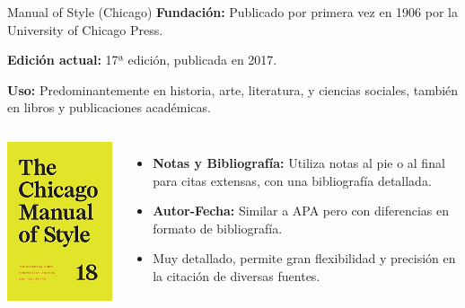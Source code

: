 \documentclass[
11pt, %
]{beamer}
\begin{document}
\begin{frame}{Manual of Style (Chicago)}
	\textbf{Fundación:} Publicado por primera vez en 1906 por la University of Chicago Press.

	\textbf{Edición actual:} 17ª edición, publicada en 2017.

	\textbf{Uso:} Predominantemente en historia, arte, literatura, y ciencias sociales, también en libros y publicaciones académicas.
	\begin{columns}[T]
		\centering
		\includegraphics[width=\textwidth]{The_Chicago_Manual_of_Style_18th_edition_cover.jpg} %
		\vspace{0.5cm}
		\begin{itemize}
			\item \textbf{Notas y Bibliografía:} Utiliza notas al pie o al final para citas extensas, con una bibliografía detallada.
			\item \textbf{Autor-Fecha:} Similar a APA pero con diferencias en formato de bibliografía.
			\item Muy detallado, permite gran flexibilidad y precisión en la citación de diversas fuentes.
		\end{itemize}
	\end{columns}
\end{frame}
\end{document}

